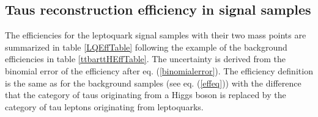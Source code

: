 %
\subsection{Taus reconstruction efficiency in signal samples}\label{signaleff}
The efficiencies for the leptoquark signal samples with their two mass points are summarized in table \ref{LQEffTable} following the example of the background efficiencies in table \ref{ttbarttHEffTable}. The uncertainty is derived from the binomial error of the efficiency after eq. (\ref{binomialerror}). The efficiency definition is the same as for the background samples (see eq. (\ref{effeq})) with the difference that the category of taus originating from a Higgs boson is replaced by the category of tau leptons originating from leptoquarks.\par
%	
